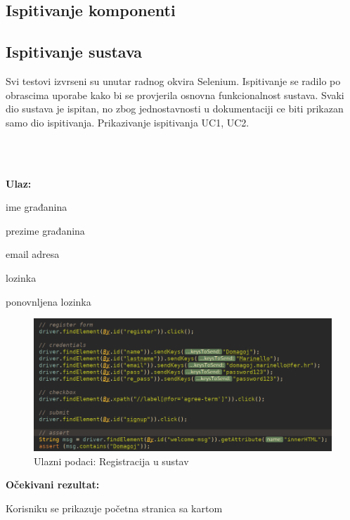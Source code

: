 			\subsection{Ispitivanje komponenti}
		
			
			\subsection{Ispitivanje sustava}
			
			Svi testovi izvrseni su unutar radnog okvira Selenium. Ispitivanje se radilo po obrascima uporabe kako bi se provjerila osnovna funkcionalnost sustava. Svaki dio sustava je ispitan, no zbog jednostavnosti u dokumentaciji ce biti prikazan samo dio ispitivanja. Prikazivanje ispitivanja UC1, UC2. \\\


			\noindent {}
			
			\
			
			\noindent \textbf{Ulaz:}
			
			\begin{packed_enum}
				\item ime građanina
				\item prezime građanina			
				\item email adresa
				\item lozinka
				\item ponovnljena lozinka
				
				
			\end{packed_enum}

			\begin{figure}[H]
					\includegraphics[scale=0.57]{figures/register-code.PNG}
					\centering
					\caption{Ulazni podaci: Registracija u sustav}
					\label{fig:Registracija u sustav}
				\end{figure}	
			
			\noindent \textbf{Očekivani rezultat:}
				\begin{packed_enum}
				\item Korisniku se prikazuje početna stranica sa kartom
							
				
			\end{packed_enum}
			
